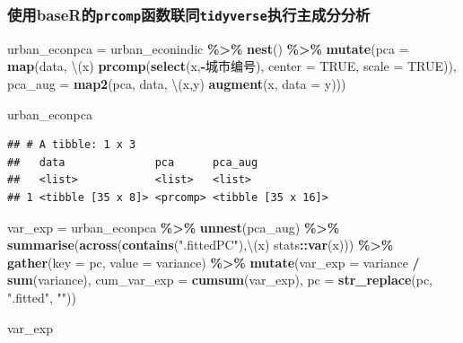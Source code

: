 \documentclass[
]{article}
\newenvironment{Shaded}{\begin{snugshade}}{\end{snugshade}}
\newcommand{\AttributeTok}[1]{\textcolor[rgb]{0.13,0.29,0.53}{#1}}
\newcommand{\ConstantTok}[1]{\textcolor[rgb]{0.56,0.35,0.01}{#1}}
\newcommand{\FunctionTok}[1]{\textcolor[rgb]{0.13,0.29,0.53}{\textbf{#1}}}
\newcommand{\NormalTok}[1]{#1}
\newcommand{\OtherTok}[1]{\textcolor[rgb]{0.56,0.35,0.01}{#1}}
\newcommand{\SpecialCharTok}[1]{\textcolor[rgb]{0.81,0.36,0.00}{\textbf{#1}}}
\newcommand{\StringTok}[1]{\textcolor[rgb]{0.31,0.60,0.02}{#1}}
\begin{document}
\subsubsection{\texorpdfstring{使用baseR的\texttt{prcomp}函数联同\texttt{tidyverse}执行主成分分析}{使用baseR的prcomp函数联同tidyverse执行主成分分析}}\label{ux4f7fux7528baserux7684prcompux51fdux6570ux8054ux540ctidyverseux6267ux884cux4e3bux6210ux5206ux5206ux6790}

\begin{Shaded}
\begin{Highlighting}[]
\NormalTok{urban\_econpca }\OtherTok{=}\NormalTok{ urban\_econindic }\SpecialCharTok{\%\textgreater{}\%} 
  \FunctionTok{nest}\NormalTok{() }\SpecialCharTok{\%\textgreater{}\%} 
  \FunctionTok{mutate}\NormalTok{(}\AttributeTok{pca =} \FunctionTok{map}\NormalTok{(data, \textbackslash{}(x) }\FunctionTok{prcomp}\NormalTok{(}\FunctionTok{select}\NormalTok{(x,}\SpecialCharTok{{-}}\StringTok{\textasciigrave{}}\AttributeTok{城市编号}\StringTok{\textasciigrave{}}\NormalTok{),}
                                     \AttributeTok{center =} \ConstantTok{TRUE}\NormalTok{, }\AttributeTok{scale =} \ConstantTok{TRUE}\NormalTok{)),}
         \AttributeTok{pca\_aug =} \FunctionTok{map2}\NormalTok{(pca, data, \textbackslash{}(x,y) }\FunctionTok{augment}\NormalTok{(x, }\AttributeTok{data =}\NormalTok{ y)))}

\NormalTok{urban\_econpca}
\end{Highlighting}
\end{Shaded}

\begin{verbatim}
## # A tibble: 1 x 3
##   data              pca      pca_aug           
##   <list>            <list>   <list>            
## 1 <tibble [35 x 8]> <prcomp> <tibble [35 x 16]>
\end{verbatim}

\begin{Shaded}
\begin{Highlighting}[]
\NormalTok{var\_exp }\OtherTok{=}\NormalTok{ urban\_econpca }\SpecialCharTok{\%\textgreater{}\%} 
  \FunctionTok{unnest}\NormalTok{(pca\_aug) }\SpecialCharTok{\%\textgreater{}\%} 
  \FunctionTok{summarise}\NormalTok{(}\FunctionTok{across}\NormalTok{(}\FunctionTok{contains}\NormalTok{(}\StringTok{".fittedPC"}\NormalTok{),\textbackslash{}(x) stats}\SpecialCharTok{::}\FunctionTok{var}\NormalTok{(x))) }\SpecialCharTok{\%\textgreater{}\%} 
  \FunctionTok{gather}\NormalTok{(}\AttributeTok{key =}\NormalTok{ pc, }\AttributeTok{value =}\NormalTok{ variance) }\SpecialCharTok{\%\textgreater{}\%} 
  \FunctionTok{mutate}\NormalTok{(}\AttributeTok{var\_exp =}\NormalTok{ variance }\SpecialCharTok{/} \FunctionTok{sum}\NormalTok{(variance),}
         \AttributeTok{cum\_var\_exp =} \FunctionTok{cumsum}\NormalTok{(var\_exp),}
         \AttributeTok{pc =} \FunctionTok{str\_replace}\NormalTok{(pc, }\StringTok{".fitted"}\NormalTok{, }\StringTok{""}\NormalTok{))}

\NormalTok{var\_exp}
\end{Highlighting}
\end{Shaded}
\end{document}
